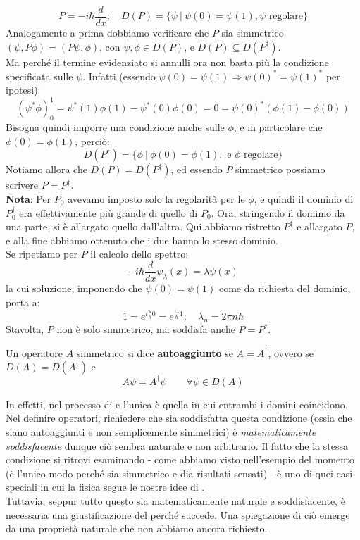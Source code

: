 \[
P=-i\hbar\frac{d}{dx}; \quad D(P) = \{\psi\>|\> \psi(0) = \psi(1), \psi \text{ regolare}\}
\] %
Analogamente a prima dobbiamo verificare che $P$ sia simmetrico $\left(\psi, P\phi\right)=(P\psi,\phi)$, con $\psi, \phi \in D(P)$, e $D(P)\subseteq D(P^\dag)$.\\
Ma perché il termine evidenziato si annulli ora non basta più la condizione specificata sulle $\psi$. Infatti (essendo $\psi(0) = \psi(1) \Rightarrow \psi(0)^* = \psi(1)^*$ per ipotesi):
\[
(\psi^* \phi)_0^1 = \psi^*(1)\phi(1) - \psi^*(0)\phi(0) = 0 = \psi(0)^*(\phi(1)-\phi(0))
\]
Bisogna quindi imporre una condizione anche sulle $\phi$, e in particolare che $\phi\left(0\right)= \phi\left(1\right)$, perciò:
\[
D(P^\dag) = \{ \phi \>|\> \phi(0) = \phi(1), \text{ e $\phi$ regolare}\}
\]
Notiamo allora che $D(P) = D(P^\dag)$, ed essendo $P$ simmetrico possiamo scrivere $P=P^\dag$.\\
\textbf{Nota}: Per $P_0$ avevamo imposto solo la regolarità per le $\phi$, e quindi il dominio di $P_0^\dag$ era effettivamente più grande di quello di $P_0$. Ora, stringendo il dominio da una parte, si è allargato quello dall'altra. Qui abbiamo ristretto $P^\dag$ e allargato $P$, e alla fine abbiamo ottenuto che i due hanno lo stesso dominio.\\
Se ripetiamo per $P$ il calcolo dello spettro:
\[
-i\hbar\frac{d}{dx}\psi_\lambda\left(x\right)=\lambda\psi\left(x\right)
\]
la cui soluzione, imponendo che $\psi\left(0\right)=\psi\left(1\right)$ come da richiesta del dominio, porta a:
\[
1=e^{i\frac{\lambda}{\hbar}0}=e^{\frac{i\lambda}{\hbar}1};\quad \lambda_n=2\pi n\hbar
\]
Stavolta, $P$ non è solo simmetrico, ma soddisfa anche $P=P^\dag$.

\begin{dfn}
Un operatore $A$ simmetrico si dice \textbf{autoaggiunto} se $A=A^\dag$, ovvero se $D\left(A\right)=D\left(A^\dag\right)$ e 
\[
A\psi=A^\dag\psi \qquad \forall\psi\in D(A)
\]
\end{dfn}
In effetti, nel processo di  e  l'unica  è quella in cui entrambi i domini coincidono. Nel definire operatori, richiedere che sia soddisfatta questa condizione (ossia che siano autoaggiunti e non semplicemente simmetrici) è \textit{matematicamente soddisfacente} dunque ciò sembra naturale e non arbitrario.
Il fatto che la stessa condizione si ritrovi esaminando  - come abbiamo visto nell'esempio del momento (è l'unico modo perché sia simmetrico e dia risultati sensati) - è uno di quei casi speciali in cui la fisica segue le nostre idee di .\\
Tuttavia, seppur tutto questo sia matematicamente naturale e soddisfacente, è necessaria una giustificazione  del perché succede. Una spiegazione di ciò emerge da una proprietà naturale che non abbiamo ancora richiesto.\\

